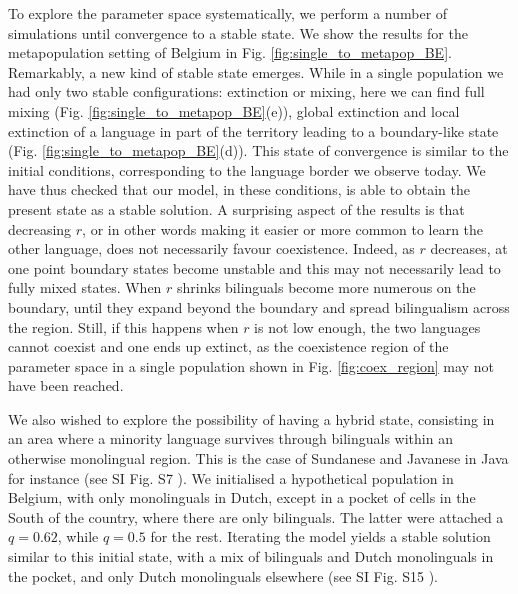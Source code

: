\documentclass[../thesis.tex]{subfiles}
\begin{document}
To explore the parameter space systematically, we perform a number of simulations until
convergence to a stable state. We show the results for the metapopulation setting of
Belgium in Fig. \ref{fig:single_to_metapop_BE}. Remarkably, a new kind of stable state
emerges. While in a single population we had only two stable configurations: extinction
or mixing, here we can find full mixing (Fig. \ref{fig:single_to_metapop_BE}(e)),
global extinction and local extinction of a language in part of the territory leading to
a boundary-like state (Fig. \ref{fig:single_to_metapop_BE}(d)). This state of
convergence is similar to the initial conditions, corresponding to the language border
we observe today. We have thus checked that our model, in these conditions, is able to
obtain the present state as a stable solution. A surprising aspect of the results is
that decreasing $r$, or in other words making it easier or more common to learn the
other language, does not necessarily favour coexistence. Indeed, as $r$ decreases, at one
point boundary states become unstable and this may not necessarily lead to fully mixed
states. When $r$ shrinks bilinguals become more numerous on the boundary, until they
expand beyond the boundary and spread bilingualism across the region. Still, if this
happens when $r$ is not low enough, the two languages cannot coexist and one ends up
extinct, as the coexistence region of the parameter space in a single population shown
in Fig. \ref{fig:coex_region} may not have been reached. 

We also wished to explore the possibility of having a hybrid state, consisting in an
area where a minority language survives through bilinguals within an otherwise
monolingual region. This is the case of Sundanese and Javanese in Java for instance (see
SI Fig. S7 \cite{supp}). We initialised a hypothetical population in Belgium, with only
monolinguals in Dutch, except in a pocket of cells in the South of the country, where
there are only bilinguals. The latter were attached a $q = 0.62$, while $q = 0.5$ for
the rest. Iterating the model yields a stable solution similar to this initial state,
with a mix of bilinguals and Dutch monolinguals in the pocket, and only Dutch
monolinguals elsewhere (see SI Fig. S15 \cite{supp}).
\end{document}
